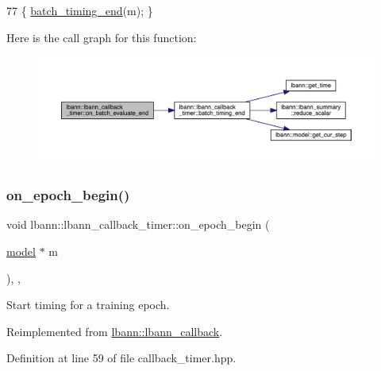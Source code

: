 \begin{DoxyCode}
77 \{ \hyperlink{classlbann_1_1lbann__callback__timer_afbf58bd4e1b4c1bcae2e50f78c9507f0}{batch\_timing\_end}(m); \}
\end{DoxyCode}
Here is the call graph for this function\+:\nopagebreak
\begin{figure}[H]
\begin{center}
\leavevmode
\includegraphics[width=350pt]{classlbann_1_1lbann__callback__timer_a1a041e3b7cc2cfea68200d9467d3eaaf_cgraph}
\end{center}
\end{figure}
\mbox{\label{classlbann_1_1lbann__callback__timer_aceecdd208aa8d75a49a41a33bf48314b}} 
\subsubsection{\texorpdfstring{on\+\_\+epoch\+\_\+begin()}{on\_epoch\_begin()}}
{\footnotesize\ttfamily void lbann\+::lbann\+\_\+callback\+\_\+timer\+::on\+\_\+epoch\+\_\+begin (\begin{DoxyParamCaption}\item[{\hyperlink{classlbann_1_1model}{model} $\ast$}]{m }\end{DoxyParamCaption})\hspace{0.3cm}{\ttfamily [inline]}, {\ttfamily [override]}, {\ttfamily [virtual]}}

Start timing for a training epoch. 

Reimplemented from \hyperlink{classlbann_1_1lbann__callback_a4ed9498763412a55953fff71ee3a9456}{lbann\+::lbann\+\_\+callback}.



Definition at line 59 of file callback\+\_\+timer.\+hpp.


